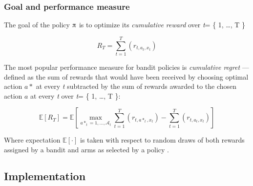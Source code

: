 \documentclass{jss}
\begin{document}
\clearpage\subsubsection{Goal and performance measure} \label{formalization}

The goal of the policy $\piup$ is to optimize its \textit{cumulative reward} over \emph{t}= \{ 1, \ldots, T \}

\begin{equation} \label{eq:1}
R_{T} = \sum^{T}_{t=1}(r_{t,a_t,x_t})
\end{equation}

The most popular performance measure for bandit policies is \textit{cumulative regret} \citep{Kuleshov2014}---defined as the sum of rewards that would have been received by choosing optimal action  $a*$ at every \emph{t} subtracted by the sum of rewards awarded to the chosen action $a$ at every \emph{t} over \emph{t}= \{ 1, \ldots, T \}:

\begin{equation} \label{eq:2}
\mathbb{E}\left[R_{T} \right] = \mathbb{E}\left[  \max_{a*_t = 1, \dots, \mathcal{A}_t} \sum^{T}_{t=1}(r_{t,a*_t,x_t}) - \sum^{T}_{t=1}(r_{t,a_t,x_t})\right]
\end{equation}

Where expectation $\mathbb{E}\left[ \mathord{\cdot}\right]$ is taken with respect to random draws of both rewards assigned by a bandit and arms as selected by a policy \citep{Zheng2016a}.

\subsection{Implementation} \label{implementation}
\end{document}
